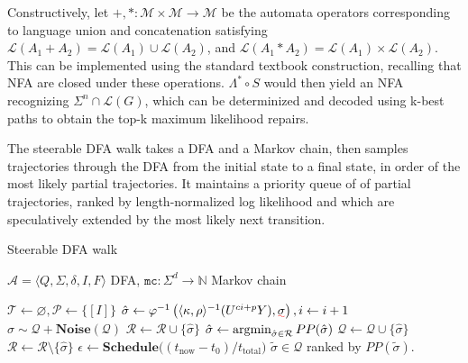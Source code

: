 \documentclass[sigplan,review,acmsmall,nonacm,anonymous]{acmart}\settopmatter{printfolios=false,printccs=false,printacmref=false}
\begin{document}
  Constructively, let $+, *: \mathcal{M}\times \mathcal{M} \rightarrow \mathcal{M}$ be the automata operators corresponding to language union and concatenation satisfying $\mathcal{L}(A_1 + A_2) = \mathcal{L}(A_1)\cup\mathcal{L}(A_2)$, and $\mathcal{L}(A_1 * A_2) = \mathcal{L}(A_1)\times\mathcal{L}(A_2)$. This can be implemented using the standard textbook construction, recalling that NFA are closed under these operations. $\Lambda^* \circ S$ would then yield an NFA recognizing $\Sigma^n\cap\mathcal{L}(G)$, which can be determinized and decoded using k-best paths to obtain the top-k maximum likelihood repairs.

  The steerable DFA walk takes a DFA and a Markov chain, then samples trajectories through the DFA from the initial state to a final state, in order of the most likely partial trajectories. It maintains a priority queue of of partial trajectories, ranked by length-normalized log likelihood and which are speculatively extended by the most likely next transition.

\begin{algorithm}[H]
\caption{Steerable DFA walk}
\label{alg:adaptive}
\begin{algorithmic}[1]
\Require $\mathcal{A} = \langle Q, \Sigma, \delta, I, F\rangle$ DFA, $\texttt{mc}: \Sigma^d \rightarrow \mathbb{N}$ Markov chain

\State $\mathcal{T} \gets \varnothing, \mathcal{P} \gets \{[I]\}$ 
\Repeat
{}
\State $\hat\sigma \gets \varphi^{-1}\left(\langle\kappa, \rho\rangle^{-1}(U^{ci+p}Y), \err{\sigma}\right), i \gets i + 1$ 
\Else
\State $\hat\sigma \sim \mathcal{Q} + \textbf{Noise}(\mathcal{Q})$ 
\EndIf
\State $\mathcal{R} \gets \mathcal{R} \cup \{\hat\sigma\}$ 
\State $\hat\sigma \gets \operatorname*{argmin}_{\hat\sigma \in \mathcal{R}} PP(\hat\sigma)$ 
\State $\mathcal{Q} \gets \mathcal{Q} \cup \{\hat\sigma\}$ 
\EndIf
\State $\mathcal{R} \gets \mathcal{R} \setminus \{\hat\sigma\}$ 
\EndIf
\State $\epsilon \leftarrow \textbf{Schedule}\big((t_{\text{now}} - t_0) / t_{\text{total}}\big)$ 
\State \Return $\tilde\sigma \in \mathcal{Q}$ ranked by $PP(\tilde\sigma)$.
\end{algorithmic}
\end{algorithm}
\end{document}
